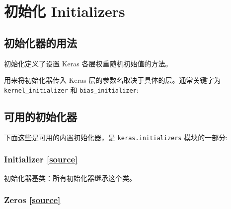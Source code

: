 \section{初始化 Initializers}
\subsection{初始化器的用法}\label{initializers}

初始化定义了设置 Keras 各层权重随机初始值的方法。

用来将初始化器传入 Keras 层的参数名取决于具体的层。通常关键字为
\texttt{kernel\_initializer} 和 \texttt{bias\_initializer}:

\begin{Shaded}
\begin{Highlighting}[]
\NormalTok{,}
                \OperatorTok{=}\NormalTok{,}
                \OperatorTok{=}\NormalTok{))}
\end{Highlighting}
\end{Shaded}

\subsection{可用的初始化器}\label{ux53efux7528ux7684ux521dux59cbux5316ux5668}

下面这些是可用的内置初始化器，是 \texttt{keras.initializers}
模块的一部分:


\subsubsection{Initializer {\href{https://github.com/keras-team/keras/blob/master/keras/initializers.py\#L14}{{[}source{]}}}}

\begin{Shaded}
\begin{Highlighting}[]
\end{Highlighting}
\end{Shaded}

初始化器基类：所有初始化器继承这个类。




\subsubsection{Zeros {\href{https://github.com/keras-team/keras/blob/master/keras/initializers.py\#L33}{{[}source{]}}}}

